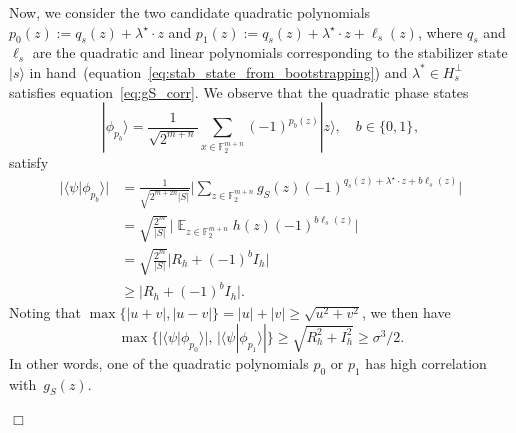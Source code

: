 \documentclass[11pt]{amsart}
\newcommand{\Exp}{\mathop{\mathbb{E}}}
\newcommand{\F}{\mathbb{F}} %
\newcommand{\bset}[1]{\{0,1\}^{#1}} %
\newcommand{\ra}{\rangle}
\newcommand{\la}{\langle}
\newcommand{\ket}[1]{|#1\rangle}
\theoremstyle{plain}
\theoremstyle{definition}
\theoremstyle{remark}
\renewenvironment{proof}[1][]{
    	\begin{trivlist}
     	\item[\hspace{\labelsep}{\em\noindent Proof#1:\/}]}
     	{{\hfill$\Box$}
    	\end{trivlist}
  }
\begin{document}
\begin{proof}[ of Lemma~\ref{lem:findingfreimanquantum}]
Now, we consider the two candidate quadratic polynomials $p_0(z) := q_s(z) + \lambda^\star \cdot z$ and $p_1(z) := q_s(z) + \lambda^\star \cdot z + \ell_s(z)$, where $q_s$ and $\ell_s$ are the quadratic and linear polynomials corresponding to the stabilizer state $\ket{s}$ in hand~(equation~\eqref{eq:stab_state_from_bootstrapping}) and $\lambda^* \in H_s^\perp$ satisfies equation~\eqref{eq:gS_corr}.
We observe that the quadratic phase states
$$\ket{\phi_{p_b}} = \frac{1}{\sqrt{2^{m+n}}} \sum_{x\in \F_2^{m+n}}(-1)^{p_b(z)}\ket{z}, \quad b\in \bset{},$$
satisfy
\begin{align*}
    |\la \psi | \phi_{p_b}\ra|
    &= \frac{1}{\sqrt{2^{m+2n} |S|}} \bigg|\sum_{z \in \F_2^{m+n}} g_S(z) (-1)^{q_s(z) + \lambda^\star \cdot z + b\ell_s(z)} \bigg| \\
    &= \sqrt{\frac{2^m}{|S|}} \,\Big|\Exp_{z \in \F_2^{m+n}} h(z) (-1)^{b\ell_s(z)} \Big| \\
    &= \sqrt{\frac{2^m}{|S|}} \big| R_h + (-1)^b I_h \big| \\
    &\geq \big| R_h + (-1)^b I_h \big|.
\end{align*}
Noting that $\max\{|u+v|,|u-v|\} = |u| + |v| \geq \sqrt{u^2 + v^2}$, we then have
\begin{equation}\label{eq:promise_quadratics}
    \max\big\{|\la \psi | \phi_{p_0} \ra|,\, |\la \psi | \phi_{p_1} \ra|\big\} \geq \sqrt{R_h^2 + I_h^2} \geq \sigma^{3}/2.
\end{equation}
In other words, one of the quadratic polynomials $p_0$ or $p_1$ has high correlation with~$g_S(z)$.


\end{proof}
\end{document}
